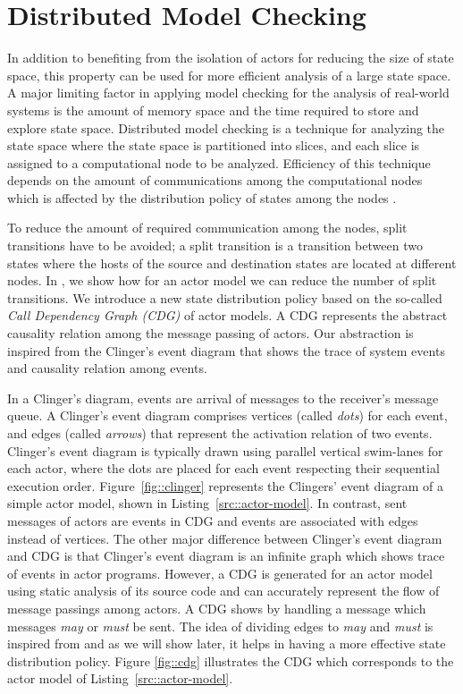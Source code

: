 \section{Distributed Model Checking} \label{sec::DMC}
In addition to benefiting from the isolation of actors for reducing the size of state space, this property can be used for more efficient analysis of a large state space. A major limiting factor in applying model checking for the analysis of real-world systems is the amount of memory space and the time required to store and explore state space. Distributed model checking is a technique for analyzing the state space
where the state space is partitioned into slices, and each slice is assigned to a computational node to be analyzed. Efficiency of this technique depends on the %
amount of communications among the computational nodes which is affected by the distribution policy of states among the nodes \cite{DBLP:journals/entcs/OrzanPE05}. 

To reduce the 
amount of required communication among the nodes, split transitions have to be avoided; a split transition is a transition between two states where the hosts of the source and destination states are located at different nodes. In \cite{DBLP:journals/eceasst/KhamespanahSMSR15}, we show how
for an actor model we can
reduce the number of split transitions. We introduce a new state distribution policy based on the so-called \textit{Call Dependency Graph (CDG)} of actor models. A CDG represents the abstract causality relation among %
the message passing of actors. Our abstraction is inspired from the Clinger's event diagram \cite{clinger} that shows the trace of system events and causality relation among events. 

In a Clinger's diagram, events are arrival of messages to the receiver's message queue. A Clinger's event diagram comprises vertices (called \emph{dots}) for each event, and edges (called \emph{arrows}) that represent the activation relation of two events. Clinger's event diagram is typically drawn using parallel vertical swim-lanes for each actor, where the dots are placed for each event respecting their sequential execution order. Figure~\ref{fig::clinger} represents the Clingers' event diagram of a simple actor model, shown in Listing~\ref{src::actor-model}. In contrast, sent messages of actors are events in CDG and events are associated with edges instead of vertices. The other major difference between Clinger's event diagram and CDG is that Clinger's event diagram is an infinite graph which shows trace of events in actor programs. However, a CDG is generated for an actor model using static analysis of its source code and can accurately represent the flow of message passings among actors. A CDG shows by handling a message which messages \emph{may} or \emph{must} be sent. The idea of dividing edges to \emph{may} and \emph{must} is inspired from \cite{DBLP:conf/lics/LarsenT88} and as we will show later, it helps in having a more effective state distribution policy. Figure \ref{fig::cdg} illustrates the CDG which corresponds to the actor model of Listing~\ref{src::actor-model}.

